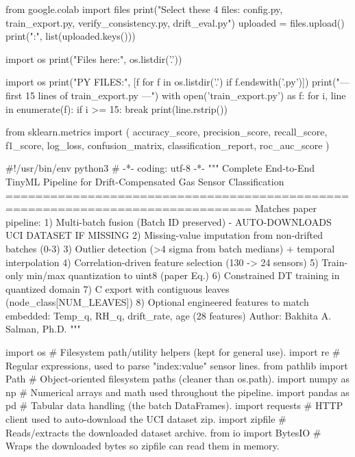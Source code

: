 from google.colab import files
print("Select these 4 files: config.py, train_export.py, verify_consistency.py, drift_eval.py")
uploaded = files.upload()
print("\nUploaded:", list(uploaded.keys()))


import os
print("Files here:", os.listdir('.'))



import os
print("PY FILES:", [f for f in os.listdir('.') if f.endswith('.py')])
print("\n--- first 15 lines of train_export.py ---")
with open('train_export.py') as f:
    for i, line in enumerate(f):
        if i >= 15: break
        print(line.rstrip())



from sklearn.metrics import (
    accuracy_score,
    precision_score,
    recall_score,
    f1_score,
    log_loss,
    confusion_matrix,
    classification_report,
    roc_auc_score
)


#!/usr/bin/env python3
# -*- coding: utf-8 -*-
"""
Complete End-to-End TinyML Pipeline for Drift-Compensated Gas Sensor Classification
===============================================================================
Matches paper pipeline:
1) Multi-batch fusion (Batch ID preserved) - AUTO-DOWNLOADS UCI DATASET IF MISSING
2) Missing-value imputation from non-drifted batches (0-3)
3) Outlier detection (>4 sigma from batch medians) + temporal interpolation
4) Correlation-driven feature selection (130 -> 24 sensors)
5) Train-only min/max quantization to uint8 (paper Eq.)
6) Constrained DT training in quantized domain
7) C export with contiguous leaves (node_class[NUM_LEAVES])
8) Optional engineered features to match embedded: Temp_q, RH_q, drift_rate, age (28 features)
Author: Bakhita A. Salman, Ph.D.
"""

import os                                  # Filesystem path/utility helpers (kept for general use).
import re                                  # Regular expressions, used to parse "index:value" sensor lines.
from pathlib import Path                   # Object-oriented filesystem paths (cleaner than os.path).
import numpy as np                         # Numerical arrays and math used throughout the pipeline.
import pandas as pd                        # Tabular data handling (the batch DataFrames).
import requests                            # HTTP client used to auto-download the UCI dataset zip.
import zipfile                             # Reads/extracts the downloaded dataset archive.
from io import BytesIO                     # Wraps the downloaded bytes so zipfile can read them in memory.

